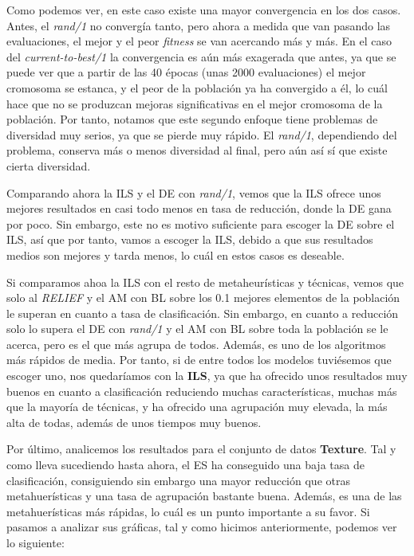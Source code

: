 \documentclass[11pt,a4paper]{article}
\begin{document}
Como podemos ver, en este caso existe una mayor convergencia en los dos casos. Antes, el \textit{rand/1} no convergía tanto,
pero ahora a medida que van pasando las evaluaciones, el mejor y el peor \textit{fitness} se van acercando más y más. En el caso
del \textit{current-to-best/1} la convergencia es aún más exagerada que antes, ya que se puede ver que a partir de las 40 épocas
(unas 2000 evaluaciones) el mejor cromosoma se estanca, y el peor de la población ya ha convergido a él, lo cuál hace que no se
produzcan mejoras significativas en el mejor cromosoma de la población. Por tanto, notamos que este segundo enfoque tiene
problemas de diversidad muy serios, ya que se pierde muy rápido. El \textit{rand/1}, dependiendo del problema, conserva más o menos
diversidad al final, pero aún así sí que existe cierta diversidad.

Comparando ahora la ILS y el DE con \textit{rand/1}, vemos que la ILS ofrece unos mejores resultados en casi todo menos en
tasa de reducción, donde la DE gana por poco. Sin embargo, este no es motivo suficiente para escoger la DE sobre el ILS, así
que por tanto, vamos a escoger la ILS, debido a que sus resultados medios son mejores y tarda menos, lo cuál en estos casos
es deseable.

Si comparamos ahoa la ILS con el resto de metaheurísticas y técnicas, vemos que solo al \textit{RELIEF} y el AM con BL sobre los
0.1 mejores elementos de la población le superan en cuanto a tasa de clasificación. Sin embargo, en cuanto a reducción solo lo supera
el DE con \textit{rand/1} y el AM con BL sobre toda la población se le acerca, pero es el que más agrupa de todos. Además, es uno
de los algoritmos más rápidos de media. Por tanto, si de entre todos los modelos tuviésemos que escoger uno, nos quedaríamos
con la \textbf{ILS}, ya que ha ofrecido unos resultados muy buenos en cuanto a clasificación reduciendo muchas características,
muchas más que la mayoría de técnicas, y ha ofrecido una agrupación muy elevada, la más alta de todas, además de unos tiempos muy
buenos.

Por último, analicemos los resultados para el conjunto de datos \textbf{Texture}. Tal y como lleva sucediendo hasta ahora, el ES
ha conseguido una baja tasa de clasificación, consiguiendo sin embargo una mayor reducción que otras metahuerísticas y una tasa
de agrupación bastante buena. Además, es una de las metahuerísticas más rápidas, lo cuál es un punto importante a su favor. Si
pasamos a analizar sus gráficas, tal y como hicimos anteriormente, podemos ver lo siguiente:
\end{document}
